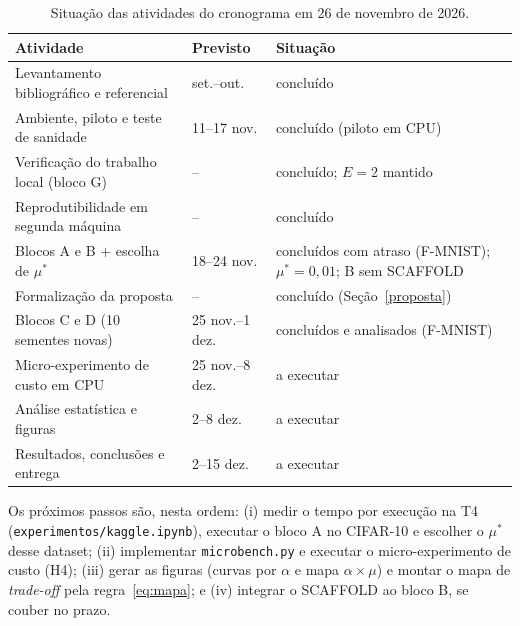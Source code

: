 \begin{table}[ht]
    \centering\small
    \caption{Situação das atividades do cronograma em 26 de novembro de 2026.}
    \label{tab:status}
    \begin{tabular}{@{}p{3.9cm}p{1.6cm}p{2.3cm}@{}}
        \toprule
        Atividade & Previsto & Situação \\
        \midrule
        Levantamento bibliográfico e referencial & set.--out. & concluído \\
        Ambiente, piloto e teste de sanidade & 11--17 nov. & concluído (piloto em CPU) \\
        Verificação do trabalho local (bloco G) & -- & concluído; $E = 2$ mantido \\
        Reprodutibilidade em segunda máquina & -- & concluído \\
        Blocos A e B + escolha de $\mu^*$ & 18--24 nov. & concluídos com atraso (F-MNIST); $\mu^* = 0{,}01$; B sem SCAFFOLD \\
        Formalização da proposta & -- & concluído (Seção~\ref{proposta}) \\
        Blocos C e D (10 sementes novas) & 25 nov.--1 dez. & concluídos e analisados (F-MNIST) \\
        Micro-experimento de custo em CPU & 25 nov.--8 dez. & a executar \\
        Análise estatística e figuras & 2--8 dez. & a executar \\
        Resultados, conclusões e entrega & 2--15 dez. & a executar \\
        \bottomrule
    \end{tabular}
\end{table}

Os próximos passos são, nesta ordem: (i) medir o tempo por execução na T4 (\texttt{experimentos/kaggle.ipynb}), executar o bloco A no CIFAR-10 e escolher o $\mu^*$ desse dataset; (ii) implementar \texttt{microbench.py} e executar o micro-experimento de custo (H4); (iii) gerar as figuras (curvas por $\alpha$ e mapa $\alpha \times \mu$) e montar o mapa de \textit{trade-off} pela regra~\eqref{eq:mapa}; e (iv) integrar o SCAFFOLD ao bloco B, se couber no prazo.

